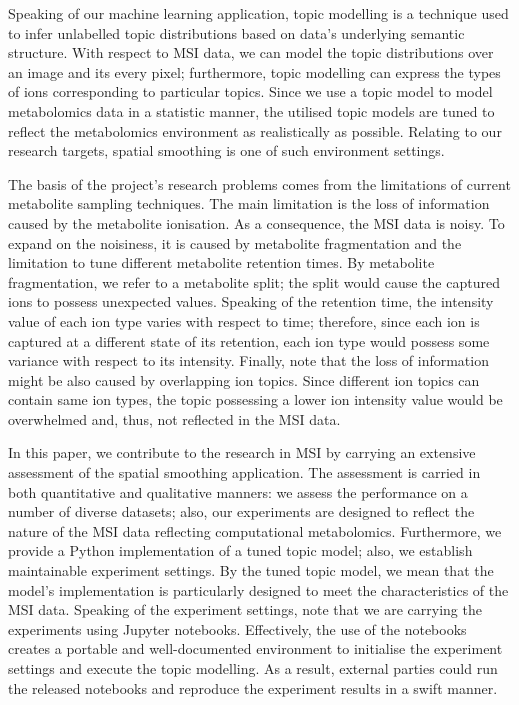 \documentclass{mpaper}
\begin{document}
\par Speaking of our machine learning application, topic modelling is a technique used to infer unlabelled topic distributions based on data's underlying semantic structure. With respect to MSI data, we can model the topic distributions over an image and its every pixel; furthermore, topic modelling can express the types of ions corresponding to particular topics. Since we use a topic model to model metabolomics data in a statistic manner, the utilised topic models are tuned to reflect the metabolomics environment as realistically as possible. Relating to our research targets, spatial smoothing is one of such environment settings.

\par The basis of the project's research problems comes from the limitations of current metabolite sampling techniques. The main limitation is the loss of information caused by the metabolite ionisation. As a consequence, the MSI data is noisy. To expand on the noisiness, it is caused by metabolite fragmentation and the limitation to tune different metabolite retention times. By metabolite fragmentation, we refer to a metabolite split; the split would cause the captured ions to possess unexpected values. Speaking of the retention time, the intensity value of each ion type varies with respect to time; therefore, since each ion is captured at a different state of its retention, each ion type would possess some variance with respect to its intensity. Finally, note that the loss of information might be also caused by overlapping ion topics. Since different ion topics can contain same ion types, the topic possessing a lower ion intensity value would be overwhelmed and, thus, not reflected in the MSI data.
\par In this paper, we contribute to the research in MSI by carrying an extensive assessment of the spatial smoothing application. The assessment is carried in both quantitative and qualitative manners: we assess the performance on a number of diverse datasets; also, our experiments are designed to reflect the nature of the MSI data reflecting computational metabolomics. Furthermore, we provide a Python implementation of a tuned topic model; also, we establish maintainable experiment settings. By the tuned topic model, we mean that the model's implementation is particularly designed to meet the characteristics of the MSI data. Speaking of the experiment settings, note that we are carrying the experiments using Jupyter notebooks. Effectively, the use of the notebooks creates a portable and well-documented environment to initialise the experiment settings and execute the topic modelling. As a result, external parties could run the released notebooks and reproduce the experiment results in a swift manner.
\end{document}
